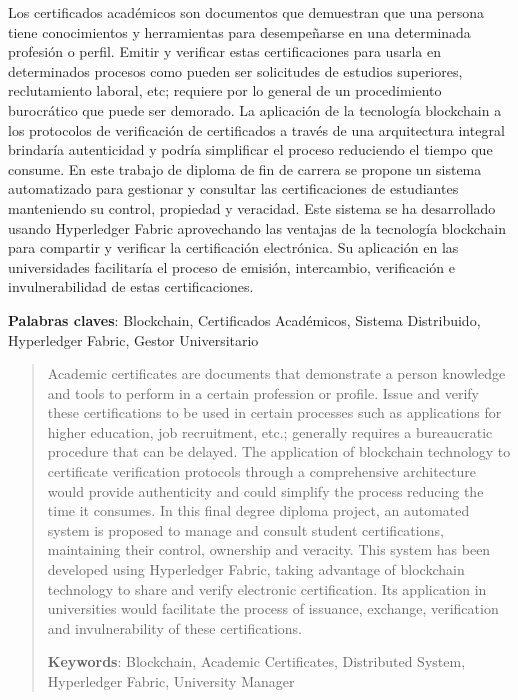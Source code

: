 \begin{resumen}
	Los certificados académicos son documentos que demuestran que una persona tiene conocimientos y herramientas para desempeñarse en una determinada profesión o perfil. Emitir y verificar estas certificaciones para usarla en determinados procesos como pueden ser solicitudes de estudios superiores, reclutamiento laboral, etc; requiere por lo general de un procedimiento burocrático que puede ser demorado. La aplicación de la tecnología blockchain a los protocolos de verificación de certificados a través de una arquitectura integral brindaría autenticidad y podría simplificar el proceso reduciendo el tiempo que consume. En este trabajo de diploma de fin de carrera se propone un sistema automatizado para gestionar y consultar las certificaciones de estudiantes manteniendo su control, propiedad y veracidad. Este sistema se ha desarrollado usando Hyperledger Fabric aprovechando las ventajas de la tecnología blockchain para compartir y verificar la certificación electrónica. Su aplicación en las universidades facilitaría el proceso de emisión, intercambio, verificación e invulnerabilidad de estas certificaciones.
	
	\:
	
	\textbf{Palabras claves}: Blockchain, Certificados Académicos, Sistema Distribuido, Hyperledger Fabric, Gestor Universitario
	
\end{resumen}

\begin{abstract}
	
	Academic certificates are documents that demonstrate a person knowledge and tools to perform in a certain profession or profile. Issue and verify these certifications to be used in certain processes such as applications for higher education, job recruitment, etc.; generally requires a bureaucratic procedure that can be delayed. The application of blockchain technology to certificate verification protocols through a comprehensive architecture would provide authenticity and could simplify the process reducing the time it consumes. In this final degree diploma project, an automated system is proposed to manage and consult student certifications, maintaining their control, ownership and veracity. This system has been developed using Hyperledger Fabric, taking advantage of blockchain technology to share and verify electronic certification. Its application in universities would facilitate the process of issuance, exchange, verification and invulnerability of these certifications.
	
	\:
	
	\textbf{Keywords}: Blockchain, Academic Certificates, Distributed System, Hyperledger Fabric, University Manager
\end{abstract}